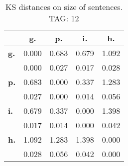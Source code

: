 \begin{table}[h!]
\begin{center}
\begin{tabular}{| l || c | c | c | c |}\hline
 & {\bf g.} & {\bf p.} & {\bf i.} & {\bf h.} \\\hline\hline
{\bf g.} & 0.000 & 0.683 & 0.679 & 1.092 \\
{\bf } & 0.000 & 0.027 & 0.017 & 0.028 \\\hline
{\bf p.} & 0.683 & 0.000 & 0.337 & 1.283 \\
{\bf } & 0.027 & 0.000 & 0.014 & 0.056 \\\hline
{\bf i.} & 0.679 & 0.337 & 0.000 & 1.398 \\
{\bf } & 0.017 & 0.014 & 0.000 & 0.042 \\\hline
{\bf h.} & 1.092 & 1.283 & 1.398 & 0.000 \\
{\bf } & 0.028 & 0.056 & 0.042 & 0.000 \\\hline
\end{tabular}
\caption{KS distances on size of sentences. TAG: 12}
\end{center}
\end{table}